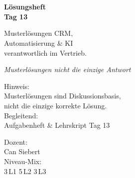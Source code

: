\documentclass[11pt,a4paper,oneside]{article}
\newcommand{\caveatfontfallback}{\itshape}
\newcommand\caveatfont{\caveatfontfallback}%
\begin{document}
\begin{titlepage}
  \pagestyle{empty}
  \vspace*{1.5cm}
  \\[2pt]
  \noindent{\color{lpAccent}\rule{\linewidth}{1.2pt}}\\[4pt]

  \vspace{3cm}
  {\sffamily\fontsize{30}{34}\selectfont\bfseries\color{lpInk}Lösungsheft\\Tag 13\par}

  \vspace{0.7cm}
  {\sffamily\large\color{lpGray}Musterlösungen \textendash{} CRM,\\Automatisierung \& KI\\verantwortlich im Vertrieb.\par}

  \vspace{1.5cm}
  {\caveatfont\LARGE\color{lpGreen}Musterlösungen \textperiodcentered{} nicht die einzige Antwort}\par

  \vfill

  \noindent\begin{minipage}{0.55\linewidth}
    {\sffamily\footnotesize\color{lpGray}Hinweis:}\\
    {\sffamily\small\color{lpInk}Musterlösungen sind Diskussionsbasis,\\nicht die einzige korrekte Lösung.}\\[10pt]
    {\sffamily\footnotesize\color{lpGray}Begleitend:}\\
    {\sffamily\small\color{lpInk}Aufgabenheft \& Lehrskript Tag 13}
  \end{minipage}\hfill
  \begin{minipage}{0.4\linewidth}
    \raggedleft
    {\sffamily\footnotesize\color{lpGray}Dozent:}\\
    {\sffamily\small\color{lpInk}Can Siebert}\\[10pt]
    {\sffamily\footnotesize\color{lpGray}Niveau-Mix:}\\
    {\sffamily\small\color{lpInk}3\,L1 \textperiodcentered{} 5\,L2 \textperiodcentered{} 3\,L3}
  \end{minipage}

  \vspace{0.5cm}
  \noindent{\color{lpAccent}\rule{\linewidth}{0.6pt}}
\end{titlepage}
\end{document}
